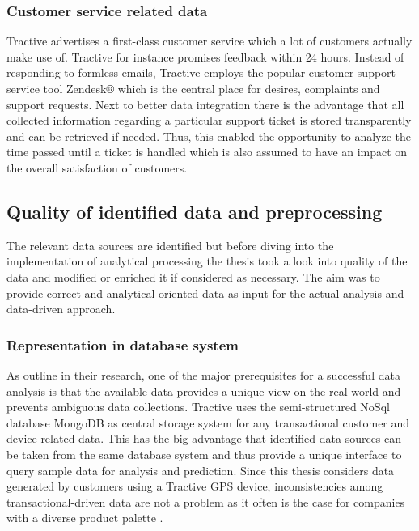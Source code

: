 \subsubsection{Customer service related data}
Tractive advertises a first-class customer service which a lot of customers actually make use of. Tractive for instance promises feedback within 24 hours. Instead of responding to formless emails, Tractive employs the popular customer support service tool Zendesk® which is the central place for desires, complaints and support requests. Next to better data integration there is the advantage that all collected information regarding a particular support ticket is stored transparently and can be retrieved if needed. Thus, this enabled the opportunity to analyze the time passed until a ticket is handled which is also assumed to have an impact on the overall satisfaction of customers.

\subsection{Quality of identified data and preprocessing}
The relevant data sources are identified but before diving into the implementation of analytical processing the thesis took a look into quality of the data and modified or enriched it if considered as necessary. The aim was to provide correct and analytical oriented data as input for the actual analysis and data-driven approach. 

\subsubsection{Representation in database system}
As \cite{neckel2015} outline in their research, one of the major prerequisites for a successful data analysis is that the available data provides a unique view on the real world and prevents ambiguous data collections. Tractive uses the semi-structured NoSql database MongoDB as central storage system for any transactional customer and device related data. This has the big advantage that identified data sources can be taken from the same database system and thus provide a unique interface to query sample data for analysis and prediction. Since this thesis considers data generated by customers using a Tractive GPS device, inconsistencies among transactional-driven data are not a problem as it often is the case for companies with a diverse product palette \cite{neckel2015}.

